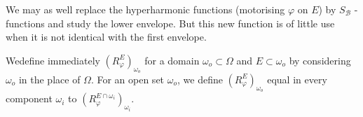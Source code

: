 \setcounter{remark}{0}
\begin{remark}%
  We may as well replace the hyperharmonic functions (motorising
  $\varphi$ on $E$) by $S_\mathscr{B}$ - functions and study the lower
  envelope. But this new function is of little use when it is not
  identical with the first envelope. 
\end{remark}

\begin{defn}\label{p4:chap3:sec13:def10}%
  We\pageoriginale define immediately $(R^E_{\varphi})_{\omega_o}$ for a domain
  $\omega_o \subset \Omega$ and $E \subset \omega_o$ by considering
  $\omega_o$ in the place of $\Omega$. For an open set $\omega_o$, we
  define $(R^E_\varphi)_{\omega_o}$ equal in every component
  $\omega_i$ to $(R^{E \cap \omega_i}_\varphi)_{\omega_i}$. 
\end{defn}
